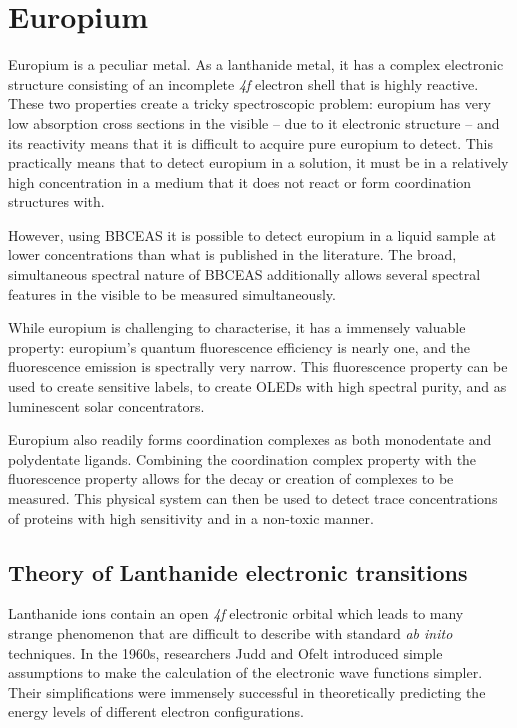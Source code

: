 \chapter{Europium}\label{chap:europium}

Europium is a peculiar metal. As a lanthanide metal, it has a complex
electronic structure consisting of an incomplete \textsl{4f} electron shell
that is highly reactive. These two properties create a tricky spectroscopic
problem: europium has very low absorption cross sections in the visible -- due
to it electronic structure -- and its reactivity means that it is difficult
to acquire pure europium to detect. This practically
means that to detect europium in a solution, it must be in a relatively
high concentration in a medium that it does not react or form coordination
structures with.

However, using \ac{BBCEAS} it is possible to detect europium in a liquid sample
at lower concentrations than what is published in the literature.
 The broad,
simultaneous spectral nature of \ac{BBCEAS} additionally allows several
spectral features in the visible to be measured simultaneously.

While europium is challenging to characterise, it has a immensely valuable
property: europium's quantum fluorescence efficiency is nearly one, and the
fluorescence emission is spectrally very narrow. This fluorescence property can
be used to create sensitive labels, to create OLEDs with high spectral purity,
and as luminescent solar concentrators.

Europium also readily forms coordination complexes as both monodentate and
polydentate ligands. Combining the coordination complex property with the
fluorescence property allows for the decay or creation of complexes to be
measured. This physical system can then be used to detect trace concentrations
of proteins with high sensitivity and in a non-toxic manner.

\section{Theory of Lanthanide electronic transitions}\label{sec:theory_eu}

Lanthanide ions contain an open \textsl{4f} electronic orbital which leads
to many strange phenomenon that are difficult to describe with standard
\textsl{ab inito} techniques. In the 1960s, researchers Judd and Ofelt introduced simple assumptions to make the calculation of the electronic wave functions simpler. Their simplifications were immensely successful in theoretically predicting the energy levels of different electron configurations.

